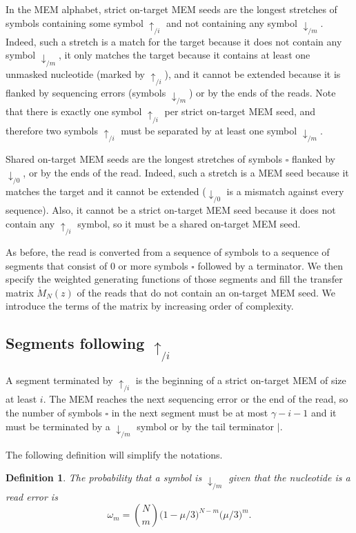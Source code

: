 \documentclass{article}
\newtheorem{definition}{Definition}
\begin{document}
In the MEM alphabet, strict on-target MEM seeds are the longest stretches
of symbols containing some symbol $\uparrow_{/i}$ and not containing any
symbol $\downarrow_{/m}$. Indeed, such a stretch is a match for the target
because it does not contain any symbol $\downarrow_{/m}$, it only matches
the target because it contains at least one unmasked nucleotide (marked by
$\uparrow_{/i}$), and it cannot be extended because it is flanked by
sequencing errors (symbols $\downarrow_{/m}$) or by the ends of the reads.
Note that there is exactly one symbol $\uparrow_{/i}$ per strict on-target
MEM seed, and therefore two symbols $\uparrow_{/i}$ must be separated by
at least one symbol $\downarrow_{/m}$.

Shared on-target MEM seeds are the longest stretches of symbols $\square$
flanked by $\downarrow_{/0}$, or by the ends of the read. Indeed, such a
stretch is a MEM seed because it matches the target and it cannot be
extended ($\downarrow_{/0}$ is a mismatch against every sequence). Also,
it cannot be a strict on-target MEM seed because it does not contain any
$\uparrow_{/i}$ symbol, so it must be a shared on-target MEM seed.

As before, the read is converted from a sequence of symbols to a sequence
of segments that consist of 0 or more symbols $\square$ followed by a
terminator. We then specify the weighted generating functions of those
segments and fill the transfer matrix $\mathring{M}_N(z)$ of the reads that
do not contain an on-target MEM seed. We introduce the terms of the matrix
by increasing order of complexity.


\subsection{Segments following $\uparrow_{/i}$}

A segment terminated by $\uparrow_{/i}$ is the beginning of a strict
on-target MEM of size at least $i$. The MEM reaches the next sequencing
error or the end of the read, so the number of symbols $\square$ in the
next segment must be at most $\gamma-i-1$ and it must be terminated by a
$\downarrow_{/m}$ symbol or by the tail terminator $|$.

The following definition will simplify the notations.

\begin{definition}
The probability that a symbol is $\downarrow_{/m}$ given that the
nucleotide is a read error is
\begin{equation}
\label{eq:omega}
\omega_m = {N \choose m} \big(1 - \mu/3\big)^{N-m} \big(\mu/3\big)^m.
\end{equation}
\end{definition}
\end{document}
